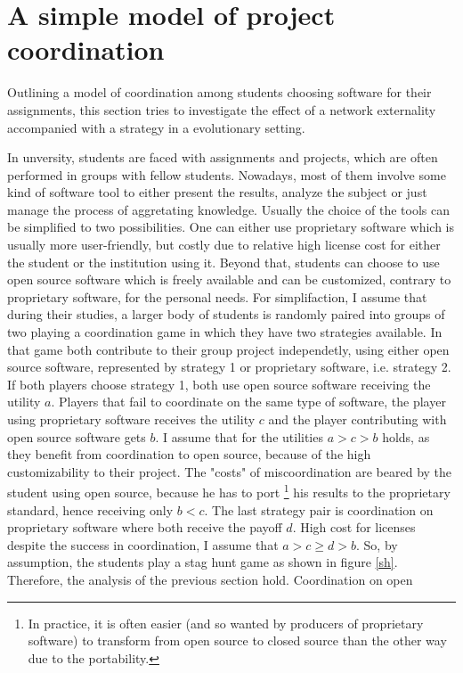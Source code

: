 \documentclass[11pt]{article}
\begin{document}
\section{A simple model of project coordination}
Outlining a model of coordination among students choosing software for their
assignments, this section tries to investigate the effect of a network 
externality accompanied with a strategy in a evolutionary setting.

In unversity, students are faced with assignments and projects, which are 
often performed in groups with fellow students.
Nowadays, most of them involve some kind of software tool to either present 
the results, analyze the subject or just manage the process of aggretating 
knowledge. Usually the choice of the tools can be simplified to two 
possibilities. One can either use proprietary software
which is usually more user-friendly, but costly due to relative high 
license cost for either the student or the institution using it. 
Beyond that, students can choose to use open source software which is freely
available and can be customized, contrary to proprietary software,
for the personal needs. 
For simplifaction, I assume that during their studies, a larger body of 
students is randomly paired into groups of two playing a coordination game
in which they have two strategies available. In that game both contribute 
to their group project independetly, using either open source software, 
represented by strategy 1 or proprietary software, i.e. strategy 2.
If both players choose strategy 1, both use open source software receiving 
the utility $a$. Players that fail to coordinate on the same type of
software, the player using proprietary software receives the utility $c$ and
the player contributing with open source software gets $b$. I assume that 
for the utilities $a>c>b$ holds, 
as they benefit from coordination to open source,
because of the high customizability to their project. The "costs" of 
miscoordination are beared by the student using open source, because he has
to port \footnote{In practice, it is
often easier (and so wanted by producers of proprietary software) to
transform from open source to closed source than the other way due to the
portability.} his results to the proprietary standard, hence receiving only
$b < c$. The last strategy pair is coordination on proprietary software where
both receive the payoff $d$. High cost for licenses despite the success 
in coordination, I assume that $a>c\geq d>b$. So, by assumption, the students
play a stag hunt game as shown in figure \ref{sh}.
Therefore, the analysis of the previous section hold. Coordination on open
\end{document}

